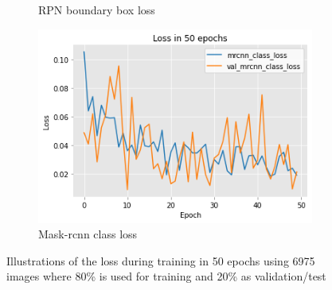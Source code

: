 \documentclass[../Head/Main.tex]{subfiles}
\begin{document}
\begin{figure}[H]
\begin{subfigure}[t]{.32\textwidth}
        \caption{RPN boundary box loss}
        \label{fig:RPN_bbox_loss_bigdata}
    \end{subfigure}
    \hfill
    \begin{subfigure}[t]{.32\textwidth}
        \centering
        \includegraphics[width=\textwidth]{../Figures/rcnn_results/loss/plot_bigdata4.png}
        \caption{Mask-rcnn class loss}
        \label{fig:mask_rcnn_class_loss_bigdata}
    \end{subfigure}
    \caption{Illustrations of the loss during training in 50 epochs using 6975 images where 80\% is used for training and 20\% as validation/test}
     \label{fig:bigdata_analysis1}
\end{figure}
\end{document}
